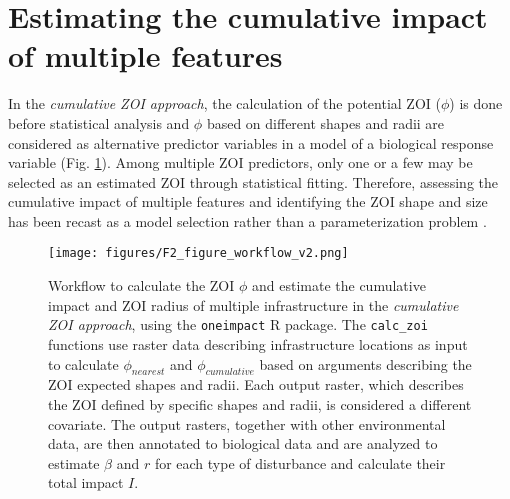 \documentclass[titlepage]{article}
\begin{document}
\section{Estimating the cumulative impact of multiple features}

In the \textit{cumulative ZOI approach}, the calculation of the potential ZOI ($\phi$) is done before statistical analysis and $\phi$ based on different shapes and radii are considered as alternative predictor variables in a model of a biological response variable (Fig. \ref{fig:workflow}). Among multiple ZOI predictors, only one or a few may be selected as an estimated ZOI through statistical fitting. Therefore, assessing the cumulative impact of multiple features and identifying the ZOI shape and size has been recast as a model selection rather than a parameterization problem \citep[such as in][]{lee_estimating_2020}.

\begin{figure}[h]
\centering
\texttt{[image: figures/F2\_figure\_workflow\_v2.png]}
\caption{\label{fig:workflow} Workflow to calculate the ZOI $\phi$ and estimate the cumulative impact and ZOI radius of multiple infrastructure in the \textit{cumulative ZOI approach}, using the \texttt{oneimpact} R package. The \texttt{calc\_zoi} functions use raster data describing infrastructure locations as input to calculate $\phi_{nearest}$ and $\phi_{cumulative}$ based on arguments describing the ZOI expected shapes and radii. Each output raster, which describes the ZOI defined by specific shapes and radii, is considered a different covariate. The output rasters, together with other environmental data, are then annotated to biological data and are analyzed to estimate $\beta$ and $r$ for each type of disturbance and calculate their total impact $I$.}
\end{figure}
\end{document}
